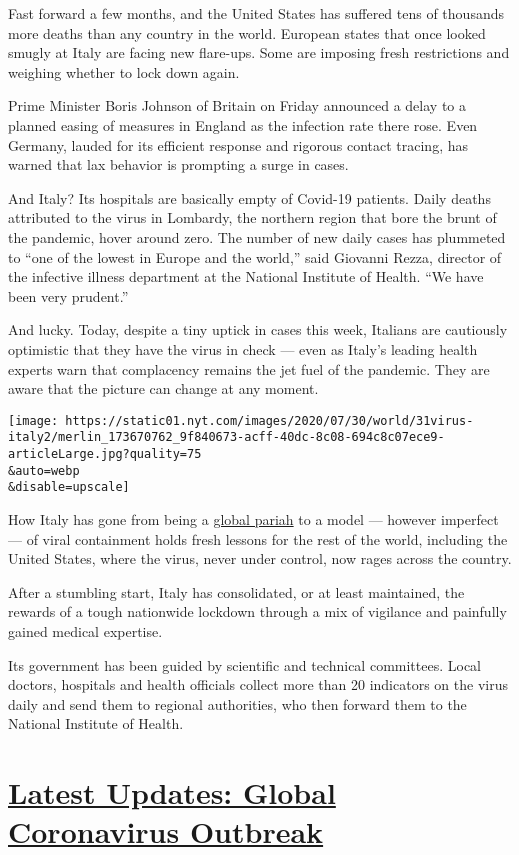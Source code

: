 Fast forward a few months, and the United States has suffered tens of
thousands more deaths than any country in the world. European states
that once looked smugly at Italy are facing new flare-ups. Some are
imposing fresh restrictions and weighing whether to lock down again.

Prime Minister Boris Johnson of Britain on Friday announced a delay to a
planned easing of measures in England as the infection rate there rose.
Even Germany, lauded for its efficient response and rigorous contact
tracing, has warned that lax behavior is prompting a surge in cases.

And Italy? Its hospitals are basically empty of Covid-19 patients. Daily
deaths attributed to the virus in Lombardy, the northern region that
bore the brunt of the pandemic, hover around zero. The number of new
daily cases has plummeted to ``one of the lowest in Europe and the
world,'' said Giovanni Rezza, director of the infective illness
department at the National Institute of Health. ``We have been very
prudent.''

And lucky. Today, despite a tiny uptick in cases this week, Italians are
cautiously optimistic that they have the virus in check --- even as
Italy's leading health experts warn that complacency remains the jet
fuel of the pandemic. They are aware that the picture can change at any
moment.

\texttt{[image: https://static01.nyt.com/images/2020/07/30/world/31virus-italy2/merlin\_173670762\_9f840673-acff-40dc-8c08-694c8c07ece9-articleLarge.jpg?quality=75\\\&auto=webp\\\&disable=upscale]}

How Italy has gone from being a
\href{https://www.nytimes.com/2020/03/21/world/europe/italy-coronavirus-center-lessons.html}{global
pariah} to a model --- however imperfect --- of viral containment holds
fresh lessons for the rest of the world, including the United States,
where the virus, never under control, now rages across the country.

After a stumbling start, Italy has consolidated, or at least maintained,
the rewards of a tough nationwide lockdown through a mix of vigilance
and painfully gained medical expertise.

Its government has been guided by scientific and technical committees.
Local doctors, hospitals and health officials collect more than 20
indicators on the virus daily and send them to regional authorities, who
then forward them to the National Institute of Health.

\hypertarget{latest-updates-global-coronavirus-outbreak}{%
\section{\texorpdfstring{\href{https://www.nytimes.com/2020/08/01/world/coronavirus-covid-19.html?action=click\&pgtype=Article\&state=default\&region=MAIN_CONTENT_1\&context=storylines_live_updates}{Latest
Updates: Global Coronavirus
Outbreak}}{Latest Updates: Global Coronavirus Outbreak}}\label{latest-updates-global-coronavirus-outbreak}}

